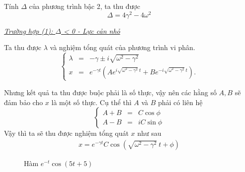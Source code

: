 Tính \(\Delta\) của phương trình bậc 2, ta thu được
\begin{equation}
    \Delta = 4 \gamma^2 - 4 \omega^2
    \label{eq:1.10}
\end{equation}
\vspace{2mm}

\underline{\textit{Trường hợp (1): $\Delta$ < 0 - Lực cản nhỏ}}

Ta thu được \(\lambda\) và nghiệm tổng quát của phương trình vi phân.
\begin{equation}
    \left\{
    \begin{array}{ccc}
    \lambda &=& - \gamma \pm  i \sqrt{\omega^2 - \gamma^2} \\
    x &=& e^{-\gamma t} \left(A e^{i\sqrt{\omega^2 - \gamma^2} \ t} + B e^{- i\sqrt{\omega^2 - \gamma^2} \ t} \right).
    \end{array}
    \right.
    \label{eq:1.11}
\end{equation}

Nhưng kết quả ta thu được buộc phải là số thực, vậy nên các hằng số $A, B$ sẽ đảm bảo cho $x$ là một số thực. Cụ thể thì $A$ và $B$ phải có liên hệ
\begin{equation*}
    \left\{
    \begin{array}{ccc}
    A + B &=& C \cos \phi \\
    A - B &=& i C \sin \phi
    \end{array}
    \right.
\end{equation*}
Vậy thì ta sẽ thu được nghiệm tổng quát \(x\) như sau
\begin{equation}
\begin{split}
    x = e^{-\gamma t} C \cos{\left(\sqrt{\omega^2 - \gamma^2} \ t + \phi \right)}
\end{split}
\label{eq:1.12}
\end{equation}

\begin{figure}[!htb]
    \centering
    \caption{Hàm \(e^{-t} \cos{\left(5t + 5 \right)}\)}
    \label{fig:1.6}
\end{figure}

